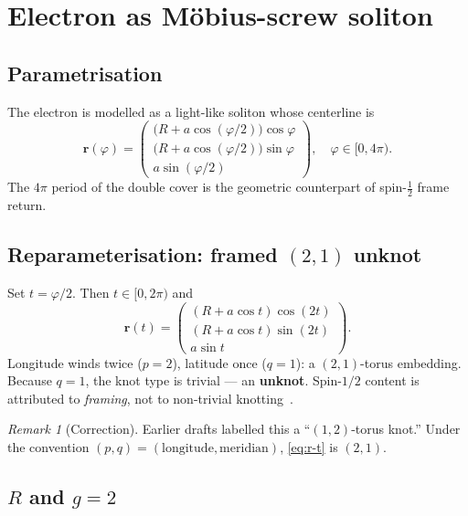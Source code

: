 \documentclass[11pt,a4paper]{article}
\theoremstyle{definition}
\theoremstyle{remark}
\newtheorem{remark}{Remark}[section]
\begin{document}
\section{Electron as M\"obius-screw soliton}
\label{sec:electron}

\subsection{Parametrisation}

The electron is modelled as a light-like soliton whose centerline is
\begin{equation}
\label{eq:r-phi}
\mathbf{r}(\varphi)
=
\begin{pmatrix}
\bigl(R + a\cos(\varphi/2)\bigr)\cos\varphi \\[4pt]
\bigl(R + a\cos(\varphi/2)\bigr)\sin\varphi \\[4pt]
a\sin(\varphi/2)
\end{pmatrix},
\quad \varphi\in[0,4\pi).
\end{equation}
The $4\pi$ period of the double cover is the geometric counterpart of
spin-$\tfrac12$ frame return.

\subsection{Reparameterisation: framed $(2,1)$ unknot}

Set $t=\varphi/2$.  Then $t\in[0,2\pi)$ and
\begin{equation}
\label{eq:r-t}
\mathbf{r}(t)
=
\begin{pmatrix}
(R + a\cos t)\cos(2t) \\[4pt]
(R + a\cos t)\sin(2t) \\[4pt]
a\sin t
\end{pmatrix}.
\end{equation}
Longitude winds twice ($p=2$), latitude once ($q=1$): a
$(2,1)$-torus embedding.  Because $q=1$, the knot type is trivial --- an
\textbf{unknot}.  Spin-$1/2$ content is attributed to \emph{framing}, not
to non-trivial knotting~\cite{Mobius2026}.

\begin{remark}[Correction]
Earlier drafts labelled this a ``$(1,2)$-torus knot.''  Under the
convention $(p,q)=(\mathrm{longitude},\mathrm{meridian})$,
\eqref{eq:r-t} is $(2,1)$.
\end{remark}

\subsection{$R$ and $g=2$}
\end{document}
